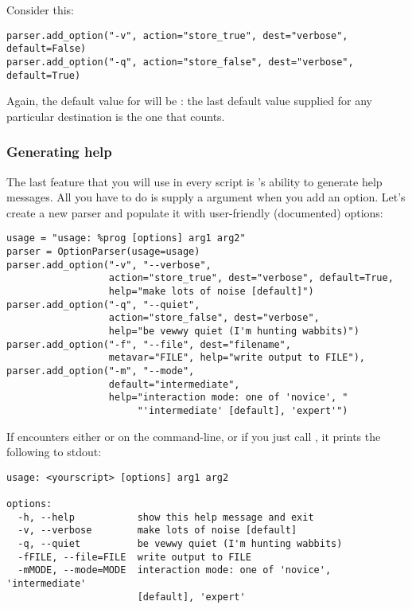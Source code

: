 Consider this:

\begin{verbatim}
parser.add_option("-v", action="store_true", dest="verbose", default=False)
parser.add_option("-q", action="store_false", dest="verbose", default=True)
\end{verbatim}

Again, the default value for  will be : the last
default value supplied for any particular destination is the one that
counts.

\subsubsection{Generating help\label{optparse-generating-help}}

The last feature that you will use in every script is
's ability to generate help messages.  All you have
to do is supply a  argument when you add an option.  Let's
create a new parser and populate it with user-friendly (documented)
options:

\begin{verbatim}
usage = "usage: %prog [options] arg1 arg2"
parser = OptionParser(usage=usage)
parser.add_option("-v", "--verbose",
                  action="store_true", dest="verbose", default=True,
                  help="make lots of noise [default]")
parser.add_option("-q", "--quiet",
                  action="store_false", dest="verbose", 
                  help="be vewwy quiet (I'm hunting wabbits)")
parser.add_option("-f", "--file", dest="filename",
                  metavar="FILE", help="write output to FILE"),
parser.add_option("-m", "--mode",
                  default="intermediate",
                  help="interaction mode: one of 'novice', "
                       "'intermediate' [default], 'expert'")
\end{verbatim}

If  encounters either  or
 on the command-line, or if you just call
, it prints the following to stdout:

\begin{verbatim}
usage: <yourscript> [options] arg1 arg2

options:
  -h, --help           show this help message and exit
  -v, --verbose        make lots of noise [default]
  -q, --quiet          be vewwy quiet (I'm hunting wabbits)
  -fFILE, --file=FILE  write output to FILE
  -mMODE, --mode=MODE  interaction mode: one of 'novice', 'intermediate'
                       [default], 'expert'
\end{verbatim}


